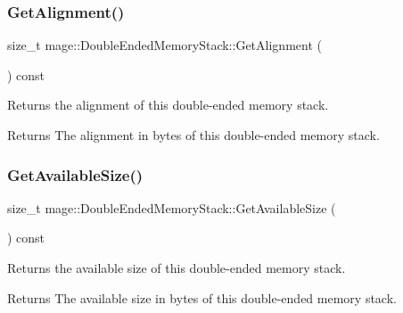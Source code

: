 \subsubsection{\texorpdfstring{Get\+Alignment()}{GetAlignment()}}
{\footnotesize\ttfamily size\+\_\+t mage\+::\+Double\+Ended\+Memory\+Stack\+::\+Get\+Alignment (\begin{DoxyParamCaption}{ }\end{DoxyParamCaption}) const\hspace{0.3cm}{\ttfamily [noexcept]}}

Returns the alignment of this double-\/ended memory stack.

\begin{DoxyReturn}{Returns}
The alignment in bytes of this double-\/ended memory stack. 
\end{DoxyReturn}
\hypertarget{classmage_1_1_double_ended_memory_stack_a7877cc0fc6a67b610aea51097c44fc8d}{}\label{classmage_1_1_double_ended_memory_stack_a7877cc0fc6a67b610aea51097c44fc8d} 
\subsubsection{\texorpdfstring{Get\+Available\+Size()}{GetAvailableSize()}}
{\footnotesize\ttfamily size\+\_\+t mage\+::\+Double\+Ended\+Memory\+Stack\+::\+Get\+Available\+Size (\begin{DoxyParamCaption}{ }\end{DoxyParamCaption}) const\hspace{0.3cm}{\ttfamily [noexcept]}}

Returns the available size of this double-\/ended memory stack.

\begin{DoxyReturn}{Returns}
The available size in bytes of this double-\/ended memory stack. 
\end{DoxyReturn}
\hypertarget{classmage_1_1_double_ended_memory_stack_aecc40b9efe5a18d0c95ca9d6e063bf38}{}\label{classmage_1_1_double_ended_memory_stack_aecc40b9efe5a18d0c95ca9d6e063bf38} 
